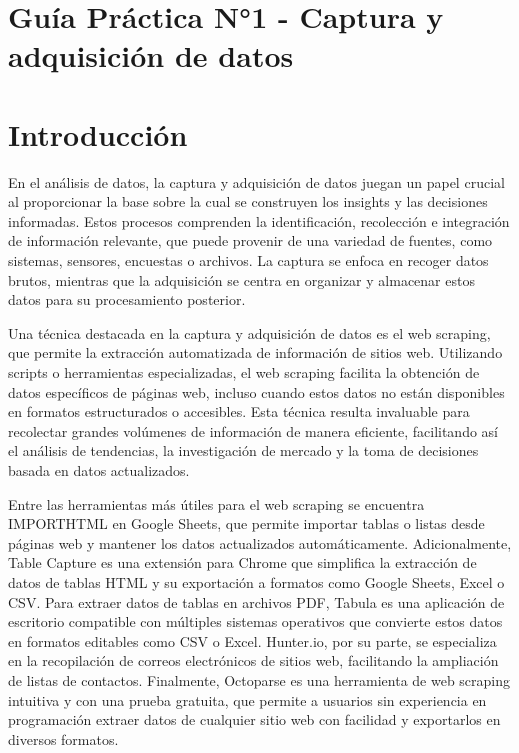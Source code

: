 \documentclass[12pt]{article}
\begin{document}
        

        \tableofcontents
        \newpage

        \section*{\centering Guía Práctica N°1 - Captura y adquisición de datos}

        \section{Introducción}
        En el análisis de datos, la captura y adquisición de datos juegan un papel crucial al proporcionar la base sobre la cual se construyen los insights y las decisiones informadas. Estos procesos comprenden la identificación, recolección e integración de información relevante, que puede provenir de una variedad de fuentes, como sistemas, sensores, encuestas o archivos. La captura se enfoca en recoger datos brutos, mientras que la adquisición se centra en organizar y almacenar estos datos para su procesamiento posterior.

        Una técnica destacada en la captura y adquisición de datos es el web scraping, que permite la extracción automatizada de información de sitios web. Utilizando scripts o herramientas especializadas, el web scraping facilita la obtención de datos específicos de páginas web, incluso cuando estos datos no están disponibles en formatos estructurados o accesibles. Esta técnica resulta invaluable para recolectar grandes volúmenes de información de manera eficiente, facilitando así el análisis de tendencias, la investigación de mercado y la toma de decisiones basada en datos actualizados.

        Entre las herramientas más útiles para el web scraping se encuentra IMPORTHTML en Google Sheets, que permite importar tablas o listas desde páginas web y mantener los datos actualizados automáticamente. Adicionalmente, Table Capture es una extensión para Chrome que simplifica la extracción de datos de tablas HTML y su exportación a formatos como Google Sheets, Excel o CSV. Para extraer datos de tablas en archivos PDF, Tabula es una aplicación de escritorio compatible con múltiples sistemas operativos que convierte estos datos en formatos editables como CSV o Excel. Hunter.io, por su parte, se especializa en la recopilación de correos electrónicos de sitios web, facilitando la ampliación de listas de contactos. Finalmente, Octoparse es una herramienta de web scraping intuitiva y con una prueba gratuita, que permite a usuarios sin experiencia en programación extraer datos de cualquier sitio web con facilidad y exportarlos en diversos formatos.
\end{document}
